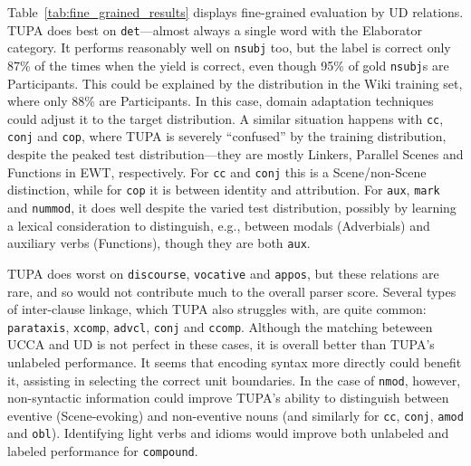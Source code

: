\documentclass[11pt,a4paper]{article}
\begin{document}
Table~\ref{tab:fine_grained_results} displays
fine-grained evaluation by UD relations.
TUPA does best on \texttt{det}---almost always a single word with the Elaborator category.
It performs reasonably well on \texttt{nsubj} too,
but the label is correct only 87\% of the times when the yield is correct,
even though 95\% of gold \texttt{nsubj}s are Participants.
This could be explained by the distribution in the Wiki training set,
where only 88\% are Participants.
In this case, domain adaptation techniques could adjust it to the target distribution.
A similar situation happens with \texttt{cc}, \texttt{conj} and \texttt{cop},
where TUPA is severely ``confused'' by the training distribution,
despite the peaked test distribution---they are mostly Linkers, Parallel Scenes
and Functions in EWT, respectively.
For \texttt{cc} and \texttt{conj} this is a Scene/non-Scene distinction,
while for \texttt{cop} it is between identity and attribution.
For \texttt{aux}, \texttt{mark} and \texttt{nummod},
it does well despite the varied test distribution,
possibly by learning a lexical consideration to distinguish,
e.g., between modals (Adverbials) and auxiliary verbs (Functions),
though they are both \texttt{aux}.

TUPA does worst on \texttt{discourse}, \texttt{vocative} and \texttt{appos},
but these relations are rare,
and so would not contribute much to the overall parser score.
Several types of inter-clause linkage, which TUPA also struggles with,
are quite common: \texttt{parataxis}, \texttt{xcomp}, \texttt{advcl},
\texttt{conj} and \texttt{ccomp}.
Although the matching beteween UCCA and UD is not perfect in these cases,
it is overall better than TUPA's unlabeled performance.
It seems that encoding syntax more directly could benefit it,
assisting in selecting the correct unit boundaries.
In the case of \texttt{nmod}, however, non-syntactic information
could improve TUPA's ability to distinguish between eventive (Scene-evoking)
and non-eventive nouns
(and similarly for \texttt{cc}, \texttt{conj}, \texttt{amod} and \texttt{obl}).
Identifying light verbs and idioms would improve
both unlabeled and labeled performance for \texttt{compound}.
\end{document}
